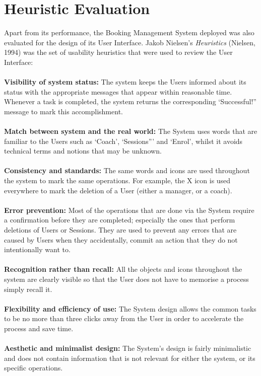 \documentclass{l3proj}
\begin{document}
\section{Heuristic Evaluation}
Apart from its performance, the Booking Management System deployed was also evaluated for the design of its User Interface. Jakob Nielsen's \emph{Heuristics} (Nielsen, 1994) was the set of usability heuristics that were used to review the User Interface:\\
\\
\textbf{Visibility of system status:}
The system keeps the Users informed about its status with the appropriate messages that appear within reasonable time. Whenever a task is completed, the system returns the corresponding `Successful!” message to mark this accomplishment.\\
 \\
\textbf{Match between system and the real world:}
The System uses words that are familiar to the Users such as ‘Coach’, ‘Sessions”’ and ‘Enrol’, whilst it avoids technical terms and notions that may be unknown.\\
 \\
\textbf{Consistency and standards:}
The same words and icons are used throughout the system to mark the same operations. For example, the X icon is used everywhere to mark the deletion of a User (either a manager, or a coach).\\
 \\
\textbf{Error prevention:}
Most of the operations that are done via the System require a confirmation before they are completed; especially the ones that perform deletions of Users or Sessions. They are used to prevent any errors that are caused by Users when they accidentally, commit an action that they do not intentionally want to.\\
 \\
\textbf{Recognition rather than recall:}
All the objects and icons throughout the system are clearly visible so that the User does not have to memorise a process simply recall it.\\
 \\
\textbf{Flexibility and efficiency of use:}
The System design allows the common tasks to be no more than three clicks away from the User in order to accelerate the process and save time.\\
 \\
\textbf{Aesthetic and minimalist design:}
The System’s design is fairly minimalistic and does not contain information that is not relevant for either the system, or its specific operations.\\
\end{document}
